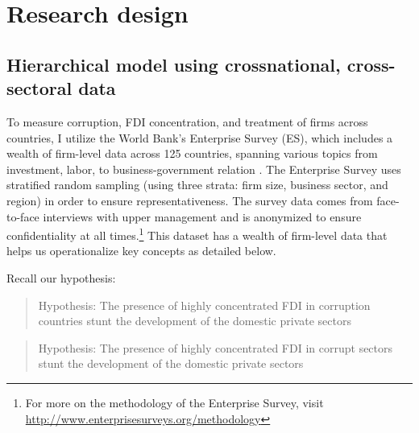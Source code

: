 \documentclass[12pt]{article}
\begin{document}
\section{Research design}

\subsection{Hierarchical model using crossnational, cross-sectoral data}

To measure corruption, FDI concentration, and treatment of firms across countries, I utilize the World Bank's Enterprise Survey (ES), which includes a wealth of firm-level data across 125 countries, spanning various topics from investment, labor, to business-government relation \citep{WorldBank2015}. The Enterprise Survey uses stratified random sampling (using three strata: firm size, business sector, and region) in order to ensure representativeness. The survey data comes from face-to-face interviews with upper management and is anonymized to ensure confidentiality at all times.\footnote{For more on the methodology of the Enterprise Survey, visit \url{http://www.enterprisesurveys.org/methodology}} This dataset has a wealth of firm-level data that helps us operationalize key concepts as detailed below.

Recall our hypothesis:

\begin{quote}
Hypothesis: The presence of highly concentrated FDI in corruption countries stunt the development of the domestic private sectors
\end{quote}

\begin{quote}
Hypothesis: The presence of highly concentrated FDI in corrupt sectors stunt the development of the domestic private sectors
\end{quote}
\end{document}
